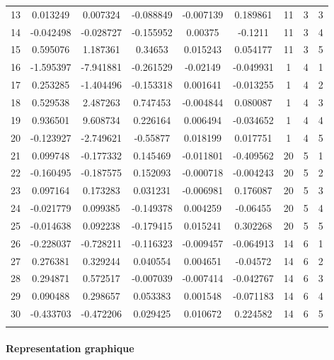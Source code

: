 \documentclass[11pt,]{article}
\let\oldparagraph\paragraph
\renewcommand{\paragraph}[1]{\oldparagraph{#1}\mbox{}}
\begin{document}
\begin{table}[!htbp]
\begin{tabular}{@{\extracolsep{5pt}} ccccccccc}
13 & 0.013249 & 0.007324 & -0.088849 & -0.007139 & 0.189861 & 11 & 3 & 3 \\ 
14 & -0.042498 & -0.028727 & -0.155952 & 0.00375 & -0.1211 & 11 & 3 & 4 \\ 
15 & 0.595076 & 1.187361 & 0.34653 & 0.015243 & 0.054177 & 11 & 3 & 5 \\ 
16 & -1.595397 & -7.941881 & -0.261529 & -0.02149 & -0.049931 & 1 & 4 & 1 \\ 
17 & 0.253285 & -1.404496 & -0.153318 & 0.001641 & -0.013255 & 1 & 4 & 2 \\ 
18 & 0.529538 & 2.487263 & 0.747453 & -0.004844 & 0.080087 & 1 & 4 & 3 \\ 
19 & 0.936501 & 9.608734 & 0.226164 & 0.006494 & -0.034652 & 1 & 4 & 4 \\ 
20 & -0.123927 & -2.749621 & -0.55877 & 0.018199 & 0.017751 & 1 & 4 & 5 \\ 
21 & 0.099748 & -0.177332 & 0.145469 & -0.011801 & -0.409562 & 20 & 5 & 1 \\ 
22 & -0.160495 & -0.187575 & 0.152093 & -0.000718 & -0.004243 & 20 & 5 & 2 \\ 
23 & 0.097164 & 0.173283 & 0.031231 & -0.006981 & 0.176087 & 20 & 5 & 3 \\ 
24 & -0.021779 & 0.099385 & -0.149378 & 0.004259 & -0.06455 & 20 & 5 & 4 \\ 
25 & -0.014638 & 0.092238 & -0.179415 & 0.015241 & 0.302268 & 20 & 5 & 5 \\ 
26 & -0.228037 & -0.728211 & -0.116323 & -0.009457 & -0.064913 & 14 & 6 & 1 \\ 
27 & 0.276381 & 0.329244 & 0.040554 & 0.004651 & -0.04572 & 14 & 6 & 2 \\ 
28 & 0.294871 & 0.572517 & -0.007039 & -0.007414 & -0.042767 & 14 & 6 & 3 \\ 
29 & 0.090488 & 0.298657 & 0.053383 & 0.001548 & -0.071183 & 14 & 6 & 4 \\ 
30 & -0.433703 & -0.472206 & 0.029425 & 0.010672 & 0.224582 & 14 & 6 & 5 \\ 
\hline \\[-1.8ex] 
\end{tabular} 
\end{table}

\FloatBarrier

\hypertarget{representation-graphique}{%
\paragraph{Representation graphique}\label{representation-graphique}}
\end{document}
